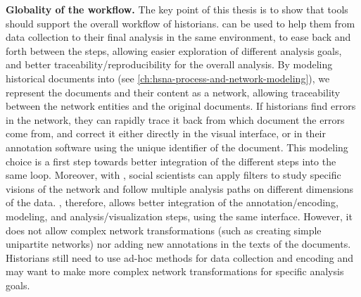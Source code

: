 \noindent\textbf{Globality of the \hsna workflow.} The key point of this thesis is to show that \va tools should support the overall \hsna workflow of historians.
\va can be used to help them from data collection to their final analysis in the same environment, to ease back and forth between the steps, allowing easier exploration of different analysis goals, and better traceability/reproducibility for the overall analysis.
By modeling historical documents into \modelplural (see \autoref{ch:hsna-process-and-network-modeling}), we represent the documents and their content as a network, allowing traceability between the network entities and the original documents.
If historians find errors in the network, they can rapidly trace it back from which document the errors come from, and correct it either directly in the visual interface, or in their annotation software using the unique identifier of the document.
This modeling choice is a first step towards better integration of the different steps into the same \va loop.
Moreover, with \combinet, social scientists can apply filters to study specific visions of the network and follow multiple analysis paths on different dimensions of the data.
\name, therefore, allows better integration of the annotation/encoding, modeling, and analysis/visualization steps, using the same interface.
However, it does not allow complex network transformations (such as creating simple unipartite networks) nor adding new annotations in the texts of the documents.
Historians still need to use ad-hoc methods for data collection and encoding and may want to make more complex network transformations for specific analysis goals.







